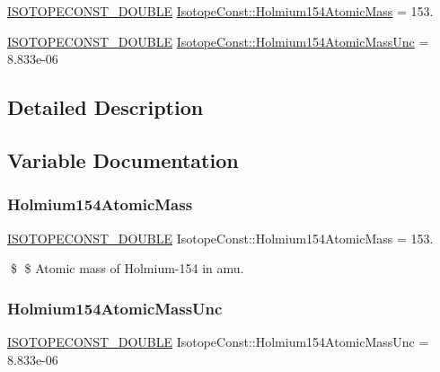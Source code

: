 \begin{DoxyCompactItemize}
\item 
\mbox{\hyperlink{group___isotope_const-_macros_ga8f45a7272ce02c0b4c65c44636ed719a}{I\+S\+O\+T\+O\+P\+E\+C\+O\+N\+S\+T\+\_\+\+D\+O\+U\+B\+LE}} \mbox{\hyperlink{group___isotope_const-_holmium-_ho154_gaf861aa8ae9eca2e40d0f48ac9055a589}{Isotope\+Const\+::\+Holmium154\+Atomic\+Mass}} = 153.
\item 
\mbox{\hyperlink{group___isotope_const-_macros_ga8f45a7272ce02c0b4c65c44636ed719a}{I\+S\+O\+T\+O\+P\+E\+C\+O\+N\+S\+T\+\_\+\+D\+O\+U\+B\+LE}} \mbox{\hyperlink{group___isotope_const-_holmium-_ho154_ga6d5dd740f86121c015ccaffb417dc314}{Isotope\+Const\+::\+Holmium154\+Atomic\+Mass\+Unc}} = 8.\+833e-\/06
\end{DoxyCompactItemize}


\subsection{Detailed Description}


\subsection{Variable Documentation}
\mbox{\label{group___isotope_const-_holmium-_ho154_gaf861aa8ae9eca2e40d0f48ac9055a589}} 
\subsubsection{\texorpdfstring{Holmium154\+Atomic\+Mass}{Holmium154AtomicMass}}
{\footnotesize\ttfamily \mbox{\hyperlink{group___isotope_const-_macros_ga8f45a7272ce02c0b4c65c44636ed719a}{I\+S\+O\+T\+O\+P\+E\+C\+O\+N\+S\+T\+\_\+\+D\+O\+U\+B\+LE}} Isotope\+Const\+::\+Holmium154\+Atomic\+Mass = 153.}

\$ \$ Atomic mass of Holmium-\/154 in amu. \mbox{\label{group___isotope_const-_holmium-_ho154_ga6d5dd740f86121c015ccaffb417dc314}} 
\subsubsection{\texorpdfstring{Holmium154\+Atomic\+Mass\+Unc}{Holmium154AtomicMassUnc}}
{\footnotesize\ttfamily \mbox{\hyperlink{group___isotope_const-_macros_ga8f45a7272ce02c0b4c65c44636ed719a}{I\+S\+O\+T\+O\+P\+E\+C\+O\+N\+S\+T\+\_\+\+D\+O\+U\+B\+LE}} Isotope\+Const\+::\+Holmium154\+Atomic\+Mass\+Unc = 8.\+833e-\/06}

